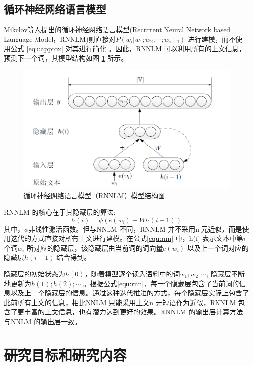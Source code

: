 \documentclass[12pt,a4paper]{article}
\begin{document}
\subsection{循环神经网络语言模型}
\label{sec:rnnlm}
Mikolov等人提出的循环神经网络语言模型(Recurrent Neural Network based Language Model，RNNLM)则直接对$P(w_i | w_1;w_2;\cdots;w_{i-1}) $ 进行建模，而不使用公式 \ref{equ:approx} 对其进行简化\cite{mikolov2012statistical,DBLP:conf/interspeech/MikolovKBCK10} 。因此，RNNLM 可以利用所有的上文信息，预测下一个词，其模型结构如图 \ref{fig:rnnlm} 所示。

\begin{figure}
  \centering
  \includegraphics[width=0.85\linewidth]{./figures/rnnlm.png}
  \caption{循环神经网络语言模型（RNNLM）模型结构图}\label{fig:rnnlm}
\end{figure}

RNNLM 的核心在于其隐藏层的算法:
\begin{equation}
\label{equ:rnn}
h(i) =\phi(e(w_i) +Wh(i -1))
\end{equation}
其中，$\phi$非线性激活函数。但与NNLM 不同，RNNLM 并不采用n 元近似，而是使用迭代的方式直接对所有上文进行建模。在公式\ref{equ:rnn} 中，h(i) 表示文本中第$i$ 个词$w_i$ 所对应的隐藏层，该隐藏层由当前词的词向量$e(w_i)$ 以及上一个词对应的隐藏层$h(i -1)$ 结合得到。

隐藏层的初始状态为$h(0)$，随着模型逐个读入语料中的词$w_1;w_2; \cdots $, 隐藏层不断地更新为$h(1);h(2); \cdots$ 。根据公式\ref{equ:rnn}，每一个隐藏层包含了当前词的信息以及上一个隐藏层的信息。通过这种迭代推进的方式，每个隐藏层实际上包含了此前所有上文的信息，相比NNLM 只能采用上文n 元短语作为近似，RNNLM 包含了更丰富的上文信息，也有潜力达到更好的效果。RNNLM 的输出层计算方法与NNLM 的输出层一致。


\section{研究目标和研究内容}
\end{document}
